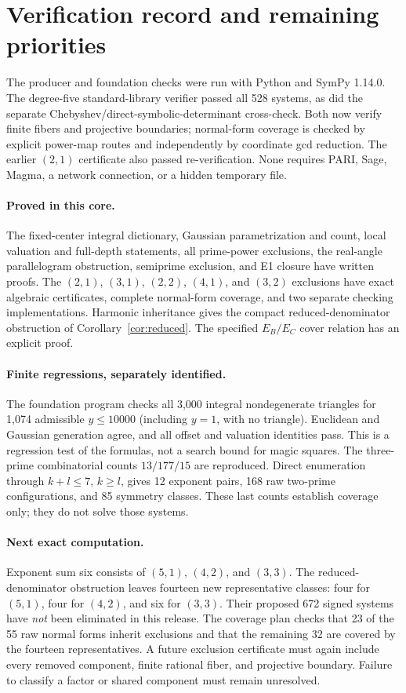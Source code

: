 \documentclass[11pt]{article}
\theoremstyle{definition}\newtheorem{definition}[theorem]{Definition}
\theoremstyle{remark}\newtheorem{remark}[theorem]{Remark}
\begin{document}
\section{Verification record and remaining priorities}\label{sec:status}
The producer and foundation checks were run with Python and SymPy 1.14.0. The degree-five standard-library verifier passed all 528 systems, as did the separate Chebyshev/direct-symbolic-determinant cross-check. Both now verify finite fibers and projective boundaries; normal-form coverage is checked by explicit power-map routes and independently by coordinate gcd reduction. The earlier $(2,1)$ certificate also passed re-verification. None requires PARI, Sage, Magma, a network connection, or a hidden temporary file.

\paragraph{Proved in this core.}
The fixed-center integral dictionary, Gaussian parametrization and count, local valuation and full-depth statements, all prime-power exclusions, the real-angle parallelogram obstruction, semiprime exclusion, and E1 closure have written proofs. The $(2,1)$, $(3,1)$, $(2,2)$, $(4,1)$, and $(3,2)$ exclusions have exact algebraic certificates, complete normal-form coverage, and two separate checking implementations. Harmonic inheritance gives the compact reduced-denominator obstruction of Corollary~\ref{cor:reduced}. The specified $E_B/E_C$ cover relation has an explicit proof.

\paragraph{Finite regressions, separately identified.}
The foundation program checks all 3,000 integral nondegenerate triangles for 1,074 admissible $y\le10000$ (including $y=1$, with no triangle). Euclidean and Gaussian generation agree, and all offset and valuation identities pass. This is a regression test of the formulas, not a search bound for magic squares. The three-prime combinatorial counts $13/177/15$ are reproduced. Direct enumeration through $k+l\le7$, $k\ge l$, gives 12 exponent pairs, 168 raw two-prime configurations, and 85 symmetry classes. These last counts establish coverage only; they do not solve those systems.

\paragraph{Next exact computation.}
Exponent sum six consists of $(5,1)$, $(4,2)$, and $(3,3)$. The reduced-denominator obstruction leaves fourteen new representative classes: four for $(5,1)$, four for $(4,2)$, and six for $(3,3)$. Their proposed 672 signed systems have \emph{not} been eliminated in this release. The coverage plan  checks that 23 of the 55 raw normal forms inherit exclusions and that the remaining 32 are covered by the fourteen representatives. A future exclusion certificate must again include every removed component, finite rational fiber, and projective boundary. Failure to classify a factor or shared component must remain unresolved.
\end{document}
